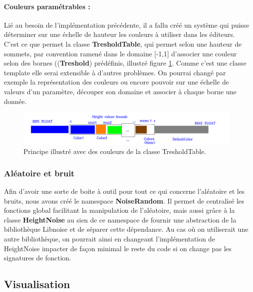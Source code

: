 \documentclass[a4paper]{article}
\begin{document}
\paragraph{Couleurs paramétrables :}

Lié au besoin de l'implémentation précédente, il a fallu créé un système qui puisse déterminer sur une échelle de hauteur les couleurs à utiliser dans les éditeurs. C'est ce que permet la classe \textbf{TresholdTable}, qui permet selon une hauteur de sommets, par convention ramené dans le domaine [-1,1] d'associer une couleur selon des bornes ((\textbf{Treshold}) prédéfinis, illustré figure \ref{archi_treshold}. Comme c'est une classe template elle serai extensible à d'autres problèmes. On pourrai changé par exemple la représentation des couleurs ou encore pouvoir sur une échelle de valeurs d'un paramètre, découper son domaine et associer à chaque borne une donnée. 

\begin{figure}[!ht]
        \begin{center} \includegraphics[width=\linewidth]{img/archi/example_treshold.png}\end{center}
        \caption{\label{archi_treshold}Principe illustré avec des couleurs de la classe TresholdTable.}
\end{figure}

\newpage
\subsubsection{Aléatoire et bruit}

Afin d'avoir une sorte de boite à outil pour tout ce qui concerne l'aléatoire et les bruits, nous avons créé le namespace \textbf{NoiseRandom}. Il permet de centralisé les fonctions global facilitant la manipulation de l'aléatoire, mais aussi grâce à la classe \textbf{HeightNoise} au sien de ce namespace de fournir une abstraction de la bibliothèque Libnoise et de séparer cette dépendance. Au cas où on utiliserait une autre bibliothèque, on pourrait ainsi en changeant l'implémentation de HeightNoise impacter de façon minimal le reste du code si on change pas les signatures de fonction.

\subsection{Visualisation}
\end{document}
